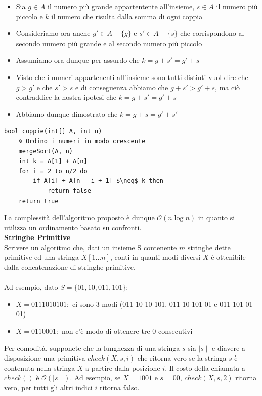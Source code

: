 \documentclass[../cheatSheetAlgoritmi.tex]{subfiles}
\begin{document}
\begin{itemize}
	\item Sia $g \in A$ il numero più grande appartentente all'insieme, $s \in A$ il numero più piccolo e $k$ il numero che risulta dalla somma di ogni coppia
	\item Consideriamo ora anche $g' \in A - \{g\}$ e $s' \in A - \{s\}$ che corrispondono al secondo numero più grande e al secondo numero più piccolo
	\item Assumiamo ora dunque per assurdo che $k = g + s' = g' + s$
	\item Visto che i numeri appartenenti all'insieme sono tutti distinti vuol dire che $g > g'$ e che $s' > s$ e di conseguenza abbiamo che $g + s' > g' + s$, ma ciò contraddice la nostra ipotesi che $k = g + s' = g' + s$
	\item Abbiamo dunque dimostrato che $k = g + s = g' + s'$ 
\end{itemize}
\begin{lstlisting}[caption=2-partition (Coppie)]
bool coppie(int[] A, int n)
	% Ordino i numeri in modo crescente
	mergeSort(A, n)
	int k = A[1] + A[n]
	for i = 2 to n/2 do
		if A[i] + A[n - i + 1] $\neq$ k then
			return false
	return true
\end{lstlisting}
La complessità dell'algoritmo proposto è dunque $\mathcal{O}(n \log n)$ in quanto si utilizza un ordinamento basato su confronti.\\
\textbf{Stringhe Primitive}\\
Scrivere un algoritmo che, dati un insieme S contenente $m$ stringhe dette primitive ed una stringa $X[1. . . n]$, conti in quanti modi diversi $X$ è ottenibile dalla concatenazione di stringhe primitive. \\\\
Ad esempio, dato $S=\{01,10,011,101\}$:
\begin{itemize}
	\item $X = 0111010101: $ ci sono 3 modi
(011-10-10-101, 011-10-101-01 e 011-101-01-01)
	\item $X = 0110001:$ non c’è modo di ottenere tre $0$ consecutivi
\end{itemize}
Per comodità, supponete che la lunghezza di una stringa $s$ sia $\mid s \mid$ e diavere a disposizione una primitiva $check(X, s, i)$ che ritorna vero se la stringa $s$ è contenuta nella stringa $X$ a partire dalla posizione $i$. Il costo della chiamata a $check()$ è $\mathcal{O}(\mid s \mid)$. Ad esempio, se $X=1001$ e $s=00$, $check(X, s,2)$ ritorna vero, per tutti gli altri indici $i$ ritorna falso.
\end{document}

